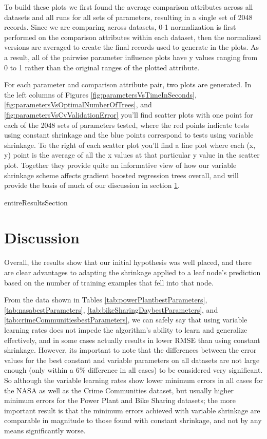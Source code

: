 \documentclass[9pt, conference]{IEEEtran}
\begin{document}
To build these plots we first found the average comparison attributes across all datasets and all runs for all sets of parameters, resulting in a single set of 2048 records. Since we are comparing across datasets, 0-1 normalization is first performed on the comparison attributes within each dataset, then the normalized versions are averaged to create the final records used to generate in the plots. As a result, all of the pairwise parameter influence plots have y values ranging from 0 to 1 rather than the original ranges of the plotted attribute.


For each parameter and comparison attribute pair, two plots are generated. In the left columns of Figures
\ref{fig:parametersVsTimeInSeconds},
\ref{fig:parametersVsOptimalNumberOfTrees}, and
\ref{fig:parametersVsCvValidationError} you'll find scatter plots with one point for each of the 2048 sets of parameters tested, where the red points indicate tests using constant shrinkage and the blue points correspond to tests using variable shrinkage. To the right of each scatter plot you'll find a line plot where each (x, y) point is the average of all the x values at that particular y value in the scatter plot. Together they provide quite an informative view of how our variable shrinkage scheme affects gradient boosted regression trees overall, and will provide the basis of much of our discussion in section \ref{sec:discussion}.
	

{entireResultsSection}

\newpage
\section{Discussion}
\label{sec:discussion}

Overall, the results show that our initial hypothesis was well placed, and there are clear advantages to adapting the shrinkage applied to a leaf node's prediction based on the number of training examples that fell into that node. 

From the data shown in Tables \ref{tab:powerPlantbestParameters}, \ref{tab:nasabestParameters}, \ref{tab:bikeSharingDaybestParameters}, and \ref{tab:crimeCommunitiesbestParameters}, we can safely say that using variable learning rates does not impede the algorithm's ability to learn and generalize effectively, and in some cases actually results in lower RMSE than using constant shrinkage. However, its important to note that the differences between the error values for the best constant and variable parameters on all datasets are not large enough (only within a 6\% difference in all cases) to be considered very significant. So although the variable learning rates show lower minimum errors in all cases for the NASA as well as the Crime Communities dataset, but usually higher minimum errors for the Power Plant and Bike Sharing datasets; the more important result is that the minimum errors achieved with variable shrinkage are comparable in magnitude to those found with constant shrinkage, and not by any means significantly worse.
\end{document}
